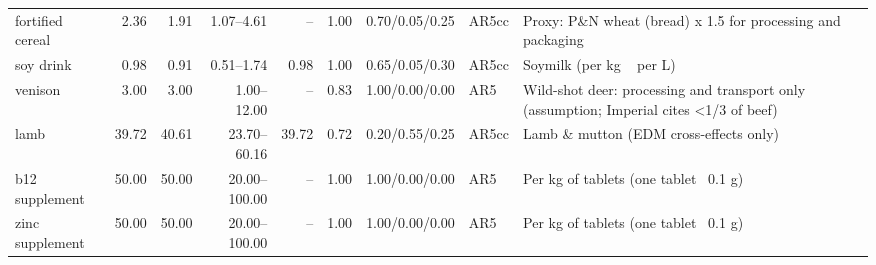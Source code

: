 \begin{tabular}{lrrrrrlll}
fortified cereal & 2.36 & 1.91 & 1.07--4.61 & -- & 1.00 & 0.70/0.05/0.25 & AR5cc & Proxy: P\&N wheat (bread) x 1.5 for processing and packaging \\
soy drink & 0.98 & 0.91 & 0.51--1.74 & 0.98 & 1.00 & 0.65/0.05/0.30 & AR5cc & Soymilk (per kg ~ per L) \\
venison & 3.00 & 3.00 & 1.00--12.00 & -- & 0.83 & 1.00/0.00/0.00 & AR5 & Wild-shot deer: processing and transport only (assumption; Imperial cites <1/3 of beef) \\
lamb & 39.72 & 40.61 & 23.70--60.16 & 39.72 & 0.72 & 0.20/0.55/0.25 & AR5cc & Lamb \& mutton (EDM cross-effects only) \\
b12 supplement & 50.00 & 50.00 & 20.00--100.00 & -- & 1.00 & 1.00/0.00/0.00 & AR5 & Per kg of tablets (one tablet ~0.1 g) \\
zinc supplement & 50.00 & 50.00 & 20.00--100.00 & -- & 1.00 & 1.00/0.00/0.00 & AR5 & Per kg of tablets (one tablet ~0.1 g) \\
\bottomrule
\end{tabular}

